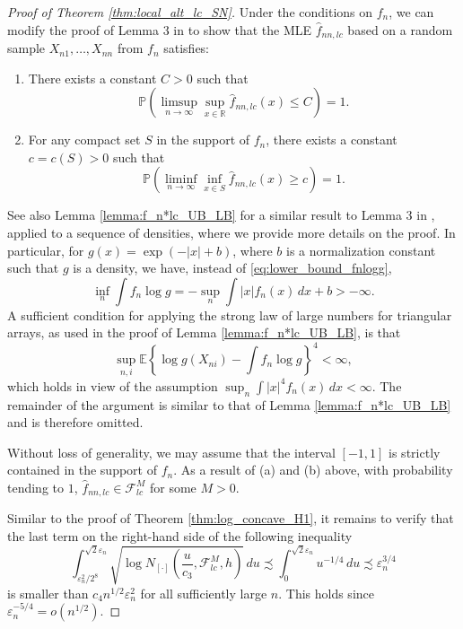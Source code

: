 \documentclass[12pt,letterpaper, twoside, openany]{article}
\theoremstyle{plain}
\begin{document}
\begin{proof}[Proof of Theorem \ref{thm:local_alt_lc_SN}]
     Under the conditions on $f_n$, we can modify the proof of Lemma 3 in \cite{cule2010theoretical} to show that the MLE $\hat{f}_{nn,lc}$ based on a random sample $X_{n1}, \ldots, X_{nn}$ from $f_n$ satisfies:
\begin{enumerate}
    \item[(a)] There exists a constant $C > 0$ such that
    \begin{equation*}
        \mathbb{P}\left( \limsup_{n \rightarrow \infty} \sup_{x \in \mathbb{R}} \hat{f}_{nn,lc}(x) \leq C \right) = 1.
    \end{equation*}

    \item[(b)] For any compact set $S$ in the support of $f_n$, there exists a constant $c = c(S) > 0$ such that
    \begin{equation*}
        \mathbb{P}\left( \liminf_{n \rightarrow \infty} \inf_{x \in S} \hat{f}_{nn,lc}(x) \geq c \right) = 1.
    \end{equation*}
\end{enumerate}
See also Lemma \ref{lemma:f_n*lc_UB_LB} for a similar result to Lemma 3 in \cite{cule2010theoretical}, applied to a sequence of densities, where we provide more details on the proof. In particular, for $g(x) = \exp(-|x| + b)$, where $b$ is a normalization constant such that $g$ is a density, we have, instead of \eqref{eq:lower_bound_fnlogg},
\begin{equation*}
    \inf_n \int f_n \log g = - \sup_n \int |x| f_n(x) \, dx + b > -\infty.
\end{equation*}
A sufficient condition for applying the strong law of large numbers for triangular arrays, as used in the proof of Lemma \ref{lemma:f_n*lc_UB_LB}, is that
\begin{equation*}
    \sup_{n,i} \mathbb{E}\left\{ \log g(X_{ni}) - \int f_n \log g \right\}^4 < \infty,
\end{equation*}
which holds in view of the assumption $\sup_n \int |x|^4 f_n(x) \, dx < \infty$. The remainder of the argument is similar to that of Lemma \ref{lemma:f_n*lc_UB_LB} and is therefore omitted.





    Without loss of generality, we may assume that the interval $[-1, 1]$ is strictly contained in the support of $f_n$. As a result of (a) and (b) above, with probability tending to $1$, $\hat{f}_{nn,lc} \in \mathcal{F}_{lc}^M$ for some $M > 0$. 
    
Similar to the proof of Theorem \ref{thm:log_concave_H1}, it remains to verify that the last term on the right-hand side of the following inequality
\begin{equation*}
    \int_{\varepsilon_n^2/2^8}^{\sqrt{2}\varepsilon_n} \sqrt{ \log N_{[\cdot]}\left( \frac{u}{c_3}, \mathcal{F}^M_{lc}, h \right)} \, du \precsim \int_0^{\sqrt{2}\varepsilon_n} u^{-1/4} \, du \precsim \varepsilon_n^{3/4}
\end{equation*}
is smaller than $c_4 n^{1/2} \varepsilon_n^2$ for all sufficiently large $n$. This holds since $\varepsilon_n^{-5/4} = o(n^{1/2})$. 
\end{proof}
\end{document}
